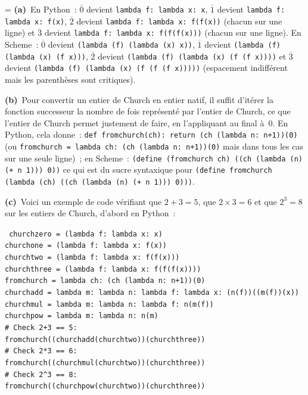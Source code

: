 \documentclass[12pt,a4paper]{article}
\theoremstyle{definition}
\newif\ifcorrige
\newenvironment{corrige}%
{\ifcorrige\relax\else\setbox0=\vbox\bgroup\fi%
\smallbreak\footnotesize\noindent{\underbar{\textit{Corrigé.}}\quad}}
{{\hbox{}\nobreak\hfill\checkmark}%
\ifcorrige\relax\else\egroup\fi\par}
\begin{document}
\begin{corrige}
\textbf{(a)} En Python : $\overline{0}$ devient \texttt{lambda f:
  lambda x: x}, $\overline{1}$ devient \texttt{lambda f: lambda x:
  f(x)}, $\overline{2}$ devient \texttt{lambda f: lambda x: f(f(x))}
(chacun sur une ligne) et $\overline{3}$ devient \texttt{lambda f:
  lambda x: f(f(f(x)))} (chacun sur une ligne).  En Scheme :
$\overline{0}$ devient \texttt{(lambda (f) (lambda (x) x))},
$\overline{1}$ devient \texttt{(lambda (f) (lambda (x) (f x)))},
$\overline{2}$ devient \texttt{(lambda (f) (lambda (x) (f (f x))))} et
$\overline{3}$ devient \texttt{(lambda (f) (lambda (x) (f (f (f
  x)))))} (espacement indifférent mais les parenthèses sont
critiques).

\textbf{(b)} Pour convertir un entier de Church en entier natif, il
suffit d'itérer la fonction successeur la nombre de fois représenté
par l'entier de Church, ce que l'entier de Church permet justement de
faire, en l'appliquant au final à $0$.  En Python, cela donne :
\texttt{def fromchurch(ch): return (ch (lambda n: n+1))(0)} (ou
\texttt{fromchurch = lambda ch: (ch (lambda n: n+1))(0)} mais dans
tous les cas sur une seule ligne) ; en Scheme : \texttt{(define
  (fromchurch ch) ((ch (lambda (n) (+ n 1))) 0))} ce qui est du sucre
syntaxique pour \texttt{(define fromchurch (lambda (ch) ((ch (lambda
  (n) (+ n 1))) 0)))}.

\textbf{(c)} Voici un exemple de code vérifiant que $2+3=5$, que
$2\times 3=6$ et que $2^3=8$ sur les entiers de Church, d'abord en
Python :

\noindent\texttt{%
churchzero = (lambda f: lambda x: x)\\
churchone = (lambda f: lambda x: f(x))\\
churchtwo = (lambda f: lambda x: f(f(x)))\\
churchthree = (lambda f: lambda x: f(f(f(x))))\\
fromchurch = lambda ch: (ch (lambda n: n+1))(0)\\
churchadd = lambda m: lambda n: lambda f: lambda x: (n(f))((m(f))(x))\\
churchmul = lambda m: lambda n: lambda f: n(m(f))\\
churchpow = lambda m: lambda n: n(m)\\
\# Check 2+3 == 5:\\
fromchurch((churchadd(churchtwo))(churchthree))\\
\# Check 2*3 == 6:\\
fromchurch((churchmul(churchtwo))(churchthree))\\
\# Check 2\textasciicircum 3 == 8:\\
fromchurch((churchpow(churchtwo))(churchthree))
}


\end{corrige}
\end{document}
